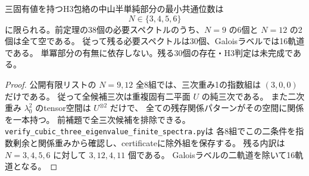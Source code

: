 \begin{theorem}
\label{thm:cubic-three-eigenvalue-30-list}
三固有値を持つH3包絡の中山半単純部分の最小共通位数は
\[
 N\in\{3,4,5,6\}
\]
に限られる。前定理の38個の必要スペクトルのうち、$N=9$ の6個と $N=12$ の2個は全て空である。
従って残る必要スペクトルは30個、Galoisラベルでは16軌道である。
単冪部分の有無に依存しない。残る30個の存在・H3判定は未完成である。
\end{theorem}
\begin{proof}
公開有限リストの $N=9,12$ 全8組では、三次重み1の指数組は $(3,0,0)$ だけである。
従って全候補三次は重複固有二平面 $U$ の純三次である。
また二次重み $\lambda_0^2$ のtensor空間は $U^{\otimes2}$ だけで、
全ての残存関係パターンがその空間に関係を一本持つ。
前補題で全三次候補を排除できる。
\texttt{verify\_cubic\_three\_eigenvalue\_finite\_spectra.py}は
各8組でこの二条件を指数剰余と関係重みから確認し、certificateに除外組を保存する。
残る内訳は $N=3,4,5,6$ に対して $3,12,4,11$ 個である。
Galoisラベルの二軌道を除いて16軌道となる。
\end{proof}
